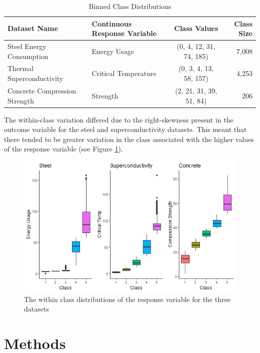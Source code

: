 \documentclass[10pt]{article}\usepackage[]{graphicx}\usepackage[]{xcolor}
\begin{document}
\begin{table}[h!]
  \begin{center}
    \caption{Binned Class Distributions}
    \label{tab:bins}
    \begin{tabular}{l|l|c|r}
      \textbf{Dataset Name} & \textbf{Continuous Response Variable} & \textbf{Class Values} & \textbf{Class Size}\\
      \hline
      Steel Energy Consumption & Energy Usage & (0, 4, 12, 31, 74, 185) & 7,008 \\
      Thermal Superconductivity & Critical Temperature & (0, 3, 4, 13, 58, 157) & 4,253  \\
      Concrete Compression Strength & Strength & (2, 21, 31, 39, 51, 84) & 206 \\
    \end{tabular}
  \end{center}
\end{table}


The within-class variation differed due to the right-skewness present in the outcome variable for the steel and superconductivity datasets. This meant that there tended to be greater variation in the class associated with the higher values of the response variable (see Figure \ref{img:class_dist}).

\begin{figure}[htp]
  \centering
  \includegraphics[scale=0.55]{general_graphics/class_distribution_boxplots.png}
  \caption{The within class distributions of the response variable for the three datasets}
  \label{img:class_dist}
\end{figure}





\section{Methods}
\end{document}
